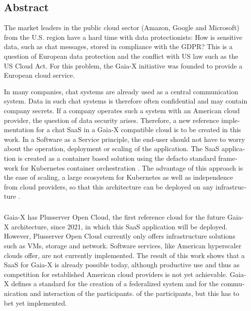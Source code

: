 

\begin{otherlanguage}{american}
	\chapter*{Abstract}
The market leaders in the public cloud sector (Amazon, Google and Microsoft) from the U.S. region
	have a hard time with data protectionists:
	How is sensitive data, such as chat messages, stored in compliance with the GDPR?
	This is a question of European data protection and the conflict with US law such as the US Cloud Act.
	For this problem, the Gaia-X initiative was founded to provide a European cloud service.

	In many companies, chat systems are already used as a central communication system.
	Data in such chat systems is therefore often confidential and may contain company secrets.
	If a company operates such a system with an American cloud provider, the question of data security arises.
	Therefore, a new reference implementation for a chat \ac{SaaS} in a Gaia-X compatible cloud is to be created in this work.
	In a Software as a Service principle, the end-user should not have to worry about the operation, deployment
	or scaling of the application. 
	The \ac{SaaS} application is created as a container based solution using the defacto standard framework for 
	Kubernetes container orchestration \cite{Burns2019}. The advantage of this approach is the ease of scaling,
	a large ecosystem for Kubernetes as well as independence from cloud providers, 
	so that this architecture can be deployed on any infrastructure \cite{Burns2019}.
	\paragraph{}
	Gaia-X has Plusserver Open Cloud, the first reference cloud for the future Gaia-X architecture, since 2021,
	in which this SaaS application will be deployed.	
	However, Plusserver Open Cloud currently only offers infrastructure solutions such as \acp{VM}, storage and network. 
	Software services, like American hyperscaler clouds offer, are not currently implemented.
	The result of this work shows that a \ac{SaaS} for Gaia-X is already possible today, 
	although productive use and thus as competition for established American cloud providers is not yet achievable. 
	Gaia-X defines a standard for the creation of a federalized system and for the communication and interaction of the participants. 
	of the participants, but this has to bet yet implemented. 


\end{otherlanguage}

